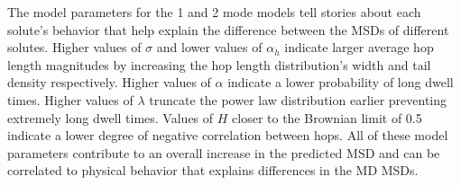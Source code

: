 \documentclass[12pt]{article}
\begin{document}
  
%  
  
  
  The model parameters for the 1 and 2 mode models tell stories about each solute's
  behavior that help explain the difference between the MSDs of different solutes. 
  Higher values of $\sigma$ and lower values of $\alpha_h$ indicate larger average 
  hop length magnitudes by increasing the hop length distribution's width and tail 
  density respectively. Higher values of $\alpha$ indicate a lower probability of 
  long dwell times. Higher values of $\lambda$ truncate the power law distribution 
  earlier preventing extremely long dwell times. Values of $H$ closer to the Brownian
  limit of 0.5 indicate a lower degree of negative correlation between hops. All 
  of these model parameters contribute to 
  an overall increase in the predicted MSD and can be correlated to physical behavior 
  that explains differences in the MD MSDs.
\end{document}
